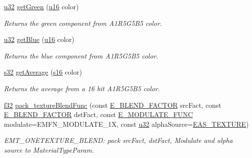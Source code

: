 \begin{DoxyCompactItemize}
\hyperlink{namespaceirr_a0416a53257075833e7002efd0a18e804}{u32} \hyperlink{namespaceirr_1_1video_a3e64185c36326ed33a494ba14cac00a5}{get\+Green} (\hyperlink{namespaceirr_ae9f8ec82692ad3b83c21f555bfa70bcc}{u16} color)
\begin{DoxyCompactList}\small\item\em Returns the green component from A1\+R5\+G5\+B5 color. \end{DoxyCompactList}\item 
\hyperlink{namespaceirr_a0416a53257075833e7002efd0a18e804}{u32} \hyperlink{namespaceirr_1_1video_ae8dc9edd5a3eb01de47933ac2d7f679e}{get\+Blue} (\hyperlink{namespaceirr_ae9f8ec82692ad3b83c21f555bfa70bcc}{u16} color)
\begin{DoxyCompactList}\small\item\em Returns the blue component from A1\+R5\+G5\+B5 color. \end{DoxyCompactList}\item 
\mbox{\label{namespaceirr_1_1video_ab242fde6c6e19ae4100fe39b0dadd9d0}} 
\hyperlink{namespaceirr_ac66849b7a6ed16e30ebede579f9b47c6}{s32} \hyperlink{namespaceirr_1_1video_ab242fde6c6e19ae4100fe39b0dadd9d0}{get\+Average} (\hyperlink{namespaceirr_a43ace0af066371ac0862bac3f7314220}{s16} color)
\begin{DoxyCompactList}\small\item\em Returns the average from a 16 bit A1\+R5\+G5\+B5 color. \end{DoxyCompactList}\item 
\hyperlink{namespaceirr_a0277be98d67dc26ff93b1a6a1d086b07}{f32} \hyperlink{namespaceirr_1_1video_ad4d715752a69b052e582b06283513e49}{pack\+\_\+texture\+Blend\+Func} (const \hyperlink{namespaceirr_1_1video_acae10401850a6cfd5fcf1548c6c884bc}{E\+\_\+\+B\+L\+E\+N\+D\+\_\+\+F\+A\+C\+T\+OR} src\+Fact, const \hyperlink{namespaceirr_1_1video_acae10401850a6cfd5fcf1548c6c884bc}{E\+\_\+\+B\+L\+E\+N\+D\+\_\+\+F\+A\+C\+T\+OR} dst\+Fact, const \hyperlink{namespaceirr_1_1video_a1402e9045137ae232fafbdf385800843}{E\+\_\+\+M\+O\+D\+U\+L\+A\+T\+E\+\_\+\+F\+U\+NC} modulate=E\+M\+F\+N\+\_\+\+M\+O\+D\+U\+L\+A\+T\+E\+\_\+1X, const \hyperlink{namespaceirr_a0416a53257075833e7002efd0a18e804}{u32} alpha\+Source=\hyperlink{namespaceirr_1_1video_a08b237bb445ffc0f32932c8ed87c6e63a35d0c453dc4c35afcace2074f44eb551}{E\+A\+S\+\_\+\+T\+E\+X\+T\+U\+RE})
\begin{DoxyCompactList}\small\item\em E\+M\+T\+\_\+\+O\+N\+E\+T\+E\+X\+T\+U\+R\+E\+\_\+\+B\+L\+E\+ND\+: pack src\+Fact, dst\+Fact, Modulate and alpha source to Material\+Type\+Param. \end{DoxyCompactList}\item 

\end{DoxyCompactItemize}
